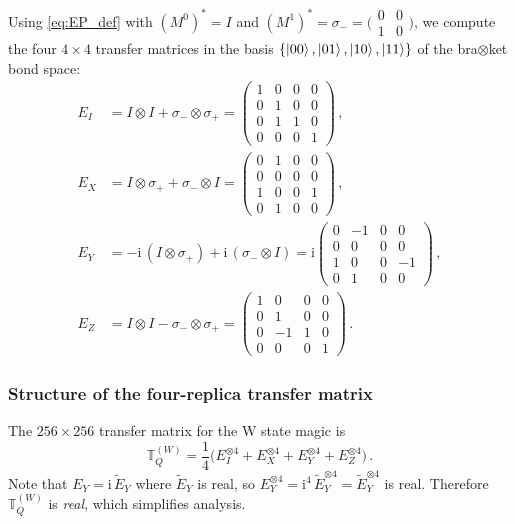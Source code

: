 \documentclass[11pt,a4paper]{article}
\theoremstyle{definition}
\theoremstyle{remark}
\newcommand{\ii}{\mathrm{i}}
\begin{document}
Using \eqref{eq:EP_def} with $(M^0)^* = I$ and $(M^1)^* = \sigma_- = \bigl(\begin{smallmatrix}0&0\\1&0\end{smallmatrix}\bigr)$, we compute the four $4\times 4$ transfer matrices in the basis $\{\ket{00},\ket{01},\ket{10},\ket{11}\}$ of the bra$\otimes$ket bond space:
\begin{align}
  E_I &= I\otimes I + \sigma_-\otimes\sigma_+
  = \begin{pmatrix} 1&0&0&0\\0&1&0&0\\0&1&1&0\\0&0&0&1\end{pmatrix}\,,\label{eq:EI_W}\\[6pt]
  E_X &= I\otimes\sigma_+ + \sigma_-\otimes I
  = \begin{pmatrix} 0&1&0&0\\0&0&0&0\\1&0&0&1\\0&1&0&0\end{pmatrix}\,,\label{eq:EX_W}\\[6pt]
  E_Y &= -\ii\,(I\otimes\sigma_+) + \ii\,(\sigma_-\otimes I)
  = \ii\begin{pmatrix} 0&-1&0&0\\0&0&0&0\\1&0&0&-1\\0&1&0&0\end{pmatrix}\,,\label{eq:EY_W}\\[6pt]
  E_Z &= I\otimes I - \sigma_-\otimes\sigma_+
  = \begin{pmatrix} 1&0&0&0\\0&1&0&0\\0&-1&1&0\\0&0&0&1\end{pmatrix}\,.\label{eq:EZ_W}
\end{align}

\subsubsection{Structure of the four-replica transfer matrix}

The $256\times 256$ transfer matrix for the W state magic is
\begin{equation}\label{eq:TQ_W}
  \mathbb{T}_Q^{(W)} = \frac{1}{4}\bigl(E_I^{\otimes 4} + E_X^{\otimes 4} + E_Y^{\otimes 4} + E_Z^{\otimes 4}\bigr)\,.
\end{equation}
Note that $E_Y = \ii\,\tilde{E}_Y$ where $\tilde{E}_Y$ is real, so $E_Y^{\otimes 4} = \ii^4\,\tilde{E}_Y^{\otimes 4} = \tilde{E}_Y^{\otimes 4}$ is real.
Therefore $\mathbb{T}_Q^{(W)}$ is \emph{real}, which simplifies analysis.
\end{document}
